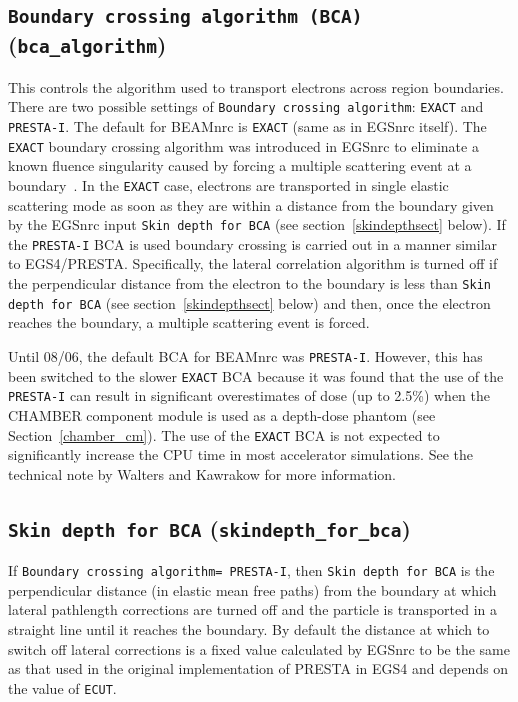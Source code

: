 \documentclass[12pt,twoside]{article}
\begin{document}
\subsection{{\tt Boundary crossing algorithm (BCA)} ({\tt bca\_algorithm})}
\label{bcasect}

This controls the algorithm used to transport electrons across region
boundaries.  There are two possible settings of
{\tt Boundary crossing algorithm}: {\tt EXACT} and
{\tt PRESTA-I}. The default for BEAMnrc is {\tt EXACT} (same as in
EGSnrc itself).
The {\tt EXACT} boundary
crossing algorithm was introduced in EGSnrc to eliminate a
known fluence singularity caused by forcing a
multiple scattering event at a boundary~\cite{FS95}.
In the {\tt EXACT} case, electrons are
transported in
single elastic scattering mode as soon as they are within a distance from
the boundary given by the EGSnrc input {\tt Skin depth for BCA} (see
section~\ref{skindepthsect} below).
If the {\tt PRESTA-I} BCA is used boundary
crossing is carried out in a manner similar to EGS4/PRESTA.
Specifically, the lateral correlation algorithm is
turned off if the perpendicular distance
from the electron to the boundary is less than
{\tt Skin depth for BCA} (see
section~\ref{skindepthsect} below) and then, once the electron reaches
the boundary, a multiple scattering event is forced.

Until 08/06, the default BCA for BEAMnrc was
{\tt PRESTA-I}.  However, this has been switched to the slower
{\tt EXACT} BCA because
it was found that the use of the {\tt PRESTA-I} can result in
significant overestimates of dose (up to 2.5\%) when the CHAMBER component
module is used as a depth-dose phantom
(see Section~\ref{chamber_cm}).
The use of the {\tt EXACT} BCA is not expected to significantly increase
the CPU time in most accelerator simulations.  See the technical note
by Walters and Kawrakow\cite{WK06} for more information.


\subsection{{\tt  Skin depth for BCA} ({\tt skindepth\_for\_bca})}
\label{skindepthsect}
If {\tt Boundary crossing algorithm= PRESTA-I}, then
{\tt Skin depth for BCA} is the perpendicular distance
(in elastic mean free paths) from the boundary
at which lateral pathlength corrections are turned off and the particle
is transported in a straight line until it reaches the boundary.
By default the distance at which to switch off
lateral corrections is a fixed value calculated by EGSnrc to be
the same as that used in the original implementation of PRESTA in EGS4
and depends on the value of {\tt ECUT}.
\end{document}
